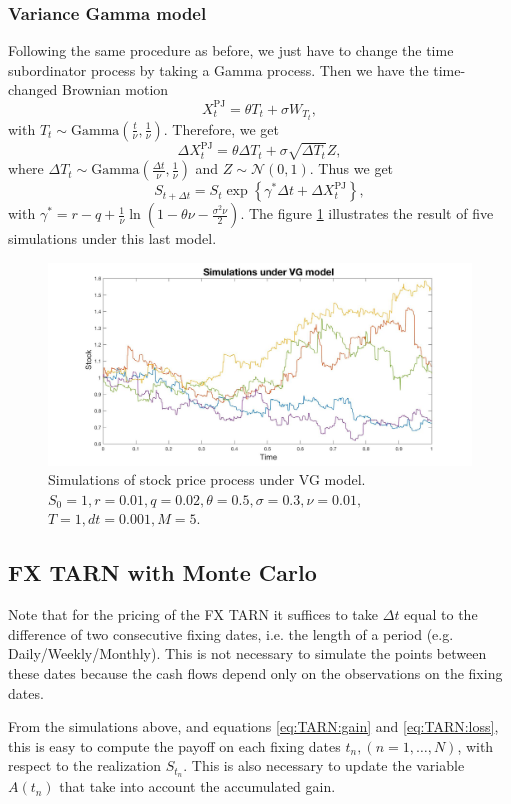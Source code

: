 \subsubsection{Variance Gamma model}
Following the same procedure as before, we just have to change the time subordinator process by taking a Gamma process. Then we have the time-changed Brownian motion
$$X_t^\text{PJ}=\theta T_t + \sigma W_{T_t},$$
with $T_t\sim \text{Gamma}\left(\frac{t}{\nu},\frac{1}{\nu} \right)$. Therefore, we get
$$\Delta X_t^\text{PJ} = \theta \Delta T_t + \sigma \sqrt{\Delta T_t} Z,$$
where $\Delta T_t\sim\text{Gamma}\left(\frac{\Delta t}{\nu},\frac{1}{\nu}\right)$ and $Z\sim\mathcal{N}(0,1)$.
Thus we get
$$S_{t+\Delta t} = S_t \exp\left\{\gamma^\ast\Delta t + \Delta X_t^\text{PJ}\right\},$$
with $\gamma^\ast = r-q + \frac{1}{\nu}\ln\left(1-\theta\nu-\frac{\sigma^2\nu}{2}\right)$.
The figure \ref{fig:MC:VG} illustrates the result of five simulations under this last model.
\begin{figure}[!htb]
	\includegraphics[width=\textwidth]{gfx/VG_plot}
	\caption{Simulations of stock price process under VG model.\\ $S_0=1, r= 0.01,q = 0.02,\theta = 0.5 , \sigma = 0.3, \nu = 0.01,$\\$T = 1, dt = 0.001, M=5$.}
	\label{fig:MC:VG}
\end{figure}
\subsection{FX TARN with Monte Carlo}
Note that for the pricing of the FX TARN it suffices to take $\Delta t$ equal to the difference of two consecutive fixing dates, i.e. the length of a period (e.g. Daily/Weekly/Monthly). This is not necessary to simulate the points between these dates because the cash flows depend only on the observations on the fixing dates.

From the simulations above, and equations \eqref{eq:TARN:gain} and \eqref{eq:TARN:loss}, this is easy to compute the payoff on each fixing dates $t_n, (n=1,\ldots,N)$, with respect to the realization $S_{t_n}$. This is also necessary to update the variable $A(t_n)$ that take into account the accumulated gain. 

